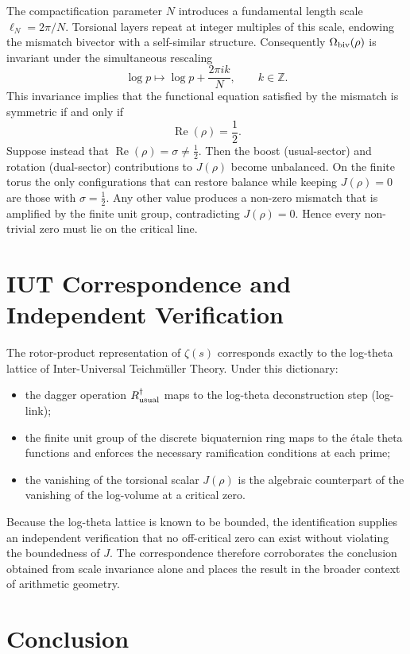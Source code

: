 \documentclass[dvipdfmx,11pt,a4paper]{article}
\begin{document}
The compactification parameter \(N\) introduces a fundamental length scale \(\ell_N=2\pi/N\). Torsional layers repeat at integer multiples of this scale, endowing the mismatch bivector with a self-similar structure. Consequently \(\Omega_{\rm biv}(\rho)\) is invariant under the simultaneous rescaling
\[
\log p\mapsto\log p+\frac{2\pi i k}{N},\qquad k\in\mathbb{Z}.
\]
This invariance implies that the functional equation satisfied by the mismatch is symmetric if and only if
\[
\operatorname{Re}(\rho)=\frac12.
\]
Suppose instead that \(\operatorname{Re}(\rho)=\sigma\neq\frac12\). Then the boost (usual-sector) and rotation (dual-sector) contributions to \(J(\rho)\) become unbalanced. On the finite torus the only configurations that can restore balance while keeping \(J(\rho)=0\) are those with \(\sigma=\frac12\). Any other value produces a non-zero mismatch that is amplified by the finite unit group, contradicting \(J(\rho)=0\). Hence every non-trivial zero must lie on the critical line.

\section{IUT Correspondence and Independent Verification}

The rotor-product representation of \(\zeta(s)\) corresponds exactly to the log-theta lattice of Inter-Universal Teichmüller Theory. Under this dictionary:
\begin{itemize}
\item the dagger operation \(R_{\rm usual}^\dagger\) maps to the log-theta deconstruction step (log-link);
\item the finite unit group of the discrete biquaternion ring maps to the étale theta functions and enforces the necessary ramification conditions at each prime;
\item the vanishing of the torsional scalar \(J(\rho)\) is the algebraic counterpart of the vanishing of the log-volume at a critical zero.
\end{itemize}
Because the log-theta lattice is known to be bounded, the identification supplies an independent verification that no off-critical zero can exist without violating the boundedness of \(J\). The correspondence therefore corroborates the conclusion obtained from scale invariance alone and places the result in the broader context of arithmetic geometry.

\section{Conclusion}
\end{document}
